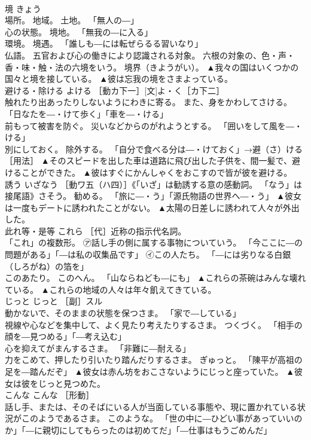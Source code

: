 \documentclass[8pt]{extreport}
\begin{document}
\begin{CJK}{UTF8}{min}
\\	境	きょう	
\\	場所。 地域。 土地。 「無人の―」 
\\	心の状態。 境地。 「無我の―に入る」 
\\	環境。 境遇。 「誰しも―には転ぜらるる習いなり」 
\\	仏語。 五官および心の働きにより認識される対象。 六根の対象の、色・声・香・味・触・法の六境をいう。 境界（きようがい）。	▲我々の国はいくつかの国々と境を接している。 ▲彼は忘我の境をさまよっている。
\\	避ける・除ける	よける	［動カ下一］[文]よ・く［カ下二］ 
\\	触れたり出あったりしないようにわきに寄る。 また、身をかわしてさける。 「日なたを―・けて歩く」「車を―・ける」 
\\	前もって被害を防ぐ。 災いなどからのがれようとする。 「囲いをして風を―・ける」 
\\	別にしておく。 除外する。 「自分で食べる分は―・けておく」→避（さ）ける［用法］	▲そのスピードを出した車は道路に飛び出した子供を、間一髪で、避けることができた。 ▲彼はすぐにかんしゃくをおこすので皆が彼を避ける。
\\	誘う	いざなう	［動ワ五（ハ四）］《「いざ」は勧誘する意の感動詞。 「なう」は接尾語》さそう。 勧める。 「旅に―・う」「源氏物語の世界へ―・う」	▲彼女は一度もデートに誘われたことがない。 ▲太陽の日差しに誘われて人々が外出した。
\\	此れ等・是等	これら	［代］近称の指示代名詞。 
\\	「これ」の複数形。 ㋐話し手の側に属する事物についていう。 「今ここに―の問題がある」「―は私の収集品です」 ㋑この人たち。 「―には劣りなる白銀（しろがね）の箔を」 
\\	このあたり。 このへん。 「山ならねども―にも」	▲これらの茶碗はみんな壊れている。 ▲これらの地域の人々は年々飢えてきている。
\\	じっと	じっと	［副］スル 
\\	動かないで、そのままの状態を保つさま。 「家で―している」 
\\	視線や心などを集中して、よく見たり考えたりするさま。 つくづく。 「相手の顔を―見つめる」「―考え込む」 
\\	心を抑えてがまんするさま。 「非難に―耐える」 
\\	力をこめて、押したり引いたり踏んだりするさま。 ぎゅっと。 「陳平が高祖の足を―踏んだぞ」	▲彼女は赤ん坊をおこさないようにじっと座っていた。 ▲彼女は彼をじっと見つめた。
\\	こんな	こんな	［形動］ 
\\	話し手、または、そのそばにいる人が当面している事態や、現に置かれている状況がこのようであるさま。 このような。 「世の中に―ひどい事があっていいのか」「―に親切にしてもらったのは初めてだ」「―仕事はもうごめんだ」 

\end{CJK}
\end{document}
